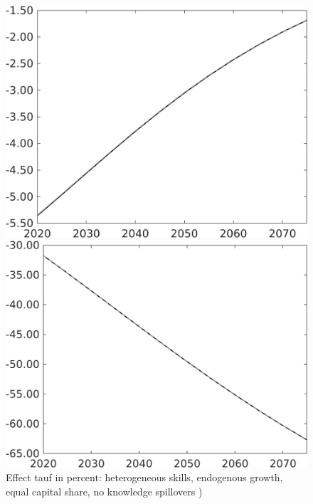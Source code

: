 \documentclass[12pt]{article}
\begin{document}
\begin{figure}[h!!]
	\centering
	\caption{Effect tauf in percent: heterogeneous skills, endogenous growth, equal capital share, no knowledge spillovers )}\label{fig:Leveltauf_nsk0_xgr0_equalcapShare_noknow_notaul3}
\begin{minipage}[]{0.32\textwidth}
	\includegraphics[width=1\textwidth]{../../codding_model/own_basedOnFried/optimalPol_010922_revision/figures/all_13Sept22/PerdifNoTauf_Equlab_regime0_CompTaul_sn_spillover0_nsk0_xgr0_knspil1_sep1_LFlimit0_emsbase0_countec0_GovRev0_etaa0.79_lgd0.png}
\end{minipage}	
\begin{minipage}[]{0.32\textwidth}
	\includegraphics[width=1\textwidth]{../../codding_model/own_basedOnFried/optimalPol_010922_revision/figures/all_13Sept22/PerdifNoTauf_Equlab_regime0_CompTaul_sff_spillover0_nsk0_xgr0_knspil1_sep1_LFlimit0_emsbase0_countec0_GovRev0_etaa0.79_lgd0.png}

\end{minipage}
\end{figure}
\end{document}
